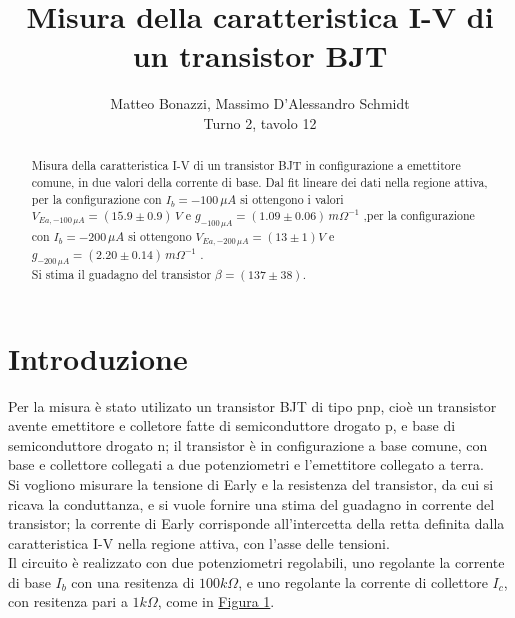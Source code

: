 \documentclass{article}
\title{Misura della caratteristica I-V di un transistor BJT}
\author{Matteo Bonazzi, Massimo D'Alessandro Schmidt\\ Turno 2, tavolo 12}
\begin{document}
\maketitle
\begin{abstract}
    Misura della caratteristica I-V di un transistor BJT in configurazione a emettitore comune, in due valori della corrente di base.\newline
    Dal fit lineare dei dati nella regione attiva, per la configurazione con $I_b=-100 \,\mu A$ si ottengono i valori $V_{Ea,-100 \,\mu A}=(15.9\pm 0.9) \,V$ e ${g_{-100 \,\mu A}=(1.09 \pm 0.06)\, m\Omega^{-1}}$ ,per la configurazione con $I_b=-200 \,\mu A$ si ottengono $V_{Ea,-200 \,\mu A}=(13\pm 1) V $ e ${g_{-200 \,\mu A}=(2.20 \pm 0.14) \, m\Omega^{-1}}$ .\\
    Si stima il guadagno del transistor $\beta=(137\pm38)$.\\
\end{abstract}
\tableofcontents
\section{Introduzione}
Per la misura è stato utilizato un transistor BJT di tipo pnp, cioè un transistor avente emettitore e colletore fatte di semiconduttore drogato p, e base di semiconduttore drogato n; il transistor è in configurazione a base comune, con base
e collettore collegati a due potenziometri e l'emettitore collegato a terra.\\
Si vogliono misurare la tensione di Early e la resistenza del transistor, da cui si ricava la conduttanza, e si vuole fornire una stima del guadagno in corrente del transistor;
la corrente di Early corrisponde all'intercetta della retta definita dalla caratteristica I-V nella regione attiva, con l'asse delle tensioni.\\
Il circuito è realizzato con due potenziometri regolabili, uno regolante la corrente di base $I_b$ con una resitenza di $100k\Omega$, e uno regolante
la corrente di collettore $I_c$, con resitenza pari a $1k\Omega$, come in \hyperref[fig:circuito]{Figura 1}.\par
\end{document}
